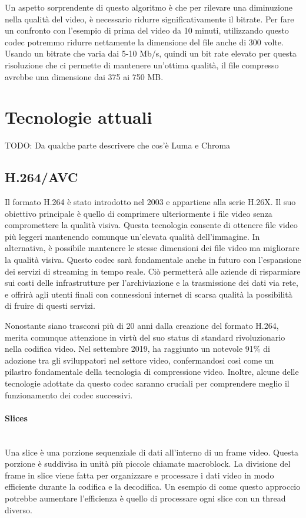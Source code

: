 \documentclass[a4paper,12pt, oneside]{article}
\begin{document}
\noindent
Un aspetto sorprendente di questo algoritmo è che per rilevare una diminuzione nella qualità del
video, è necessario ridurre significativamente il bitrate.
Per fare un confronto con l'esempio di prima del video da 10 minuti, utilizzando questo codec potremmo
ridurre nettamente la dimensione del file anche di 300 volte. Usando un bitrate che varia dai 5-10 Mb/s,
quindi un bit rate elevato per questa risoluzione che ci permette di mantenere un'ottima qualità,
il file compresso avrebbe una dimensione dai 375 ai 750 MB.

\section{Tecnologie attuali}
TODO: Da qualche parte descrivere che cos'è Luma e Chroma
\subsection{H.264/AVC}
Il formato H.264 è stato introdotto nel 2003 e appartiene alla serie H.26X. Il suo obiettivo principale
è quello di comprimere ulteriormente i file video senza compromettere la qualità visiva. Questa
tecnologia consente di ottenere file video più leggeri mantenendo comunque un'elevata qualità
dell'immagine. In alternativa, è possibile mantenere le stesse dimensioni dei file video ma migliorare
la qualità visiva. Questo codec sarà fondamentale anche in futuro con l'espansione dei servizi di
streaming in tempo reale. Ciò permetterà alle aziende di risparmiare sui costi delle infrastrutture
per l'archiviazione e la trasmissione dei dati via rete, e offrirà agli utenti finali con connessioni
internet di scarsa qualità la possibilità di fruire di questi servizi.

Nonostante siano trascorsi più di 20 anni dalla creazione del formato H.264, merita comunque attenzione
in virtù del suo status di standard rivoluzionario nella codifica video. Nel settembre 2019, ha
raggiunto un notevole 91\% di adozione tra gli sviluppatori nel settore video, confermandosi così come
un pilastro fondamentale della tecnologia di compressione video. Inoltre, alcune delle tecnologie
adottate da questo codec saranno cruciali per comprendere meglio il funzionamento dei codec successivi.

\paragraph{Slices}\hphantom{A}\\
Una slice è una porzione sequenziale di dati all'interno di un frame video. Questa porzione è suddivisa
in unità più piccole chiamate macroblock. La divisione del frame in slice viene fatta per organizzare e
processare i dati video in modo efficiente durante la codifica e la decodifica. Un esempio di come
questo approccio potrebbe aumentare l'efficienza è quello di processare ogni slice con un thread diverso.
\end{document}

